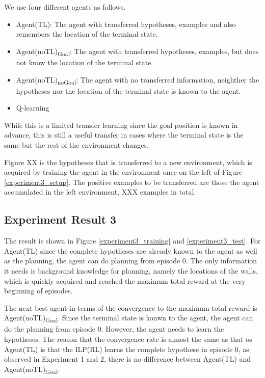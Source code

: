 We use four different agents as follows. 

\begin{itemize}
    \item Agent(TL): The agent with transferred hypotheses, examples and also remembers the location of the terminal state.
    \item Agent(noTL)\textsubscript{Goal}: The agent with transferred hypotheses, examples, but does not know the location of the terminal state.
    \item Agent(noTL)\textsubscript{noGoal}: The agent with no transferred information, neighther the hypotheses nor the location of the terminal state is known to the agent.
    \item Q-learning
\end{itemize}

While this is a limited transfer learning since the goal position is known in advance, this is still a useful transfer in cases where the terminal state is the same but the rest of the environment changes.

Figure XX is the hypotheses that is transferred to a new environment, which is acquired by training the agent in the environment once on the left of Figure \ref{experiment3_setup}.
The positive examples to be transferred are those the agent accumulated in the left environment, XXX examples in total.



\subsection{Experiment Result 3}
The result is shown in Figure \ref{experiment3_training} and \ref{experiment3_test}.
For Agent(TL) since the complete hypotheses are already known to the agent as well as the planning, the agent can do planning from episode 0.
The only information it needs is background knowledge for planning, namely the locations of the walls, which is quickly acquired and reached the maximum total reward at the very beginning of episodes.

The next best agent in terms of the convergence to the maximum total reward is Agent(noTL)\textsubscript{Goal}. Since the terminal state is konwn to the agent, 
the agent can do the planning from episode 0. However, the agent needs to learn the hypotheses. The reason that the convergence rate is almost the same as that os Agent(TL) is that
the ILP(RL) learns the complete hypothese in episode 0, as observed in Experiment 1 and 2, there is no difference between Agent(TL) and Agent(noTL)\textsubscript{Goal}. 

